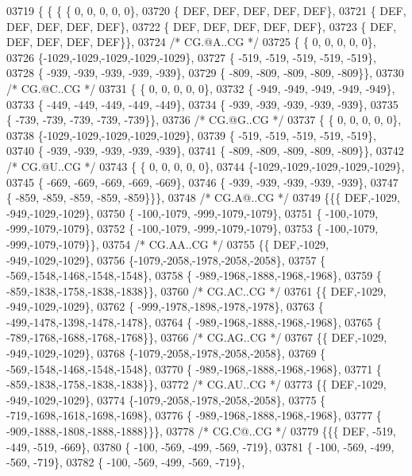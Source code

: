 \begin{DoxyCode}
03719 \{ \{ \{ \{  0, 0, 0, 0, 0\},
03720 \{  DEF,  DEF,  DEF,  DEF,  DEF\},
03721 \{  DEF,  DEF,  DEF,  DEF,  DEF\},
03722 \{  DEF,  DEF,  DEF,  DEF,  DEF\},
03723 \{  DEF,  DEF,  DEF,  DEF,  DEF\}\},
03724 \textcolor{comment}{/* CG.@A..CG */}
03725 \{ \{  0, 0, 0, 0, 0\},
03726 \{-1029,-1029,-1029,-1029,-1029\},
03727 \{ -519, -519, -519, -519, -519\},
03728 \{ -939, -939, -939, -939, -939\},
03729 \{ -809, -809, -809, -809, -809\}\},
03730 \textcolor{comment}{/* CG.@C..CG */}
03731 \{ \{  0, 0, 0, 0, 0\},
03732 \{ -949, -949, -949, -949, -949\},
03733 \{ -449, -449, -449, -449, -449\},
03734 \{ -939, -939, -939, -939, -939\},
03735 \{ -739, -739, -739, -739, -739\}\},
03736 \textcolor{comment}{/* CG.@G..CG */}
03737 \{ \{  0, 0, 0, 0, 0\},
03738 \{-1029,-1029,-1029,-1029,-1029\},
03739 \{ -519, -519, -519, -519, -519\},
03740 \{ -939, -939, -939, -939, -939\},
03741 \{ -809, -809, -809, -809, -809\}\},
03742 \textcolor{comment}{/* CG.@U..CG */}
03743 \{ \{  0, 0, 0, 0, 0\},
03744 \{-1029,-1029,-1029,-1029,-1029\},
03745 \{ -669, -669, -669, -669, -669\},
03746 \{ -939, -939, -939, -939, -939\},
03747 \{ -859, -859, -859, -859, -859\}\}\},
03748 \textcolor{comment}{/* CG.A@..CG */}
03749 \{\{\{  DEF,-1029, -949,-1029,-1029\},
03750 \{ -100,-1079, -999,-1079,-1079\},
03751 \{ -100,-1079, -999,-1079,-1079\},
03752 \{ -100,-1079, -999,-1079,-1079\},
03753 \{ -100,-1079, -999,-1079,-1079\}\},
03754 \textcolor{comment}{/* CG.AA..CG */}
03755 \{\{  DEF,-1029, -949,-1029,-1029\},
03756 \{-1079,-2058,-1978,-2058,-2058\},
03757 \{ -569,-1548,-1468,-1548,-1548\},
03758 \{ -989,-1968,-1888,-1968,-1968\},
03759 \{ -859,-1838,-1758,-1838,-1838\}\},
03760 \textcolor{comment}{/* CG.AC..CG */}
03761 \{\{  DEF,-1029, -949,-1029,-1029\},
03762 \{ -999,-1978,-1898,-1978,-1978\},
03763 \{ -499,-1478,-1398,-1478,-1478\},
03764 \{ -989,-1968,-1888,-1968,-1968\},
03765 \{ -789,-1768,-1688,-1768,-1768\}\},
03766 \textcolor{comment}{/* CG.AG..CG */}
03767 \{\{  DEF,-1029, -949,-1029,-1029\},
03768 \{-1079,-2058,-1978,-2058,-2058\},
03769 \{ -569,-1548,-1468,-1548,-1548\},
03770 \{ -989,-1968,-1888,-1968,-1968\},
03771 \{ -859,-1838,-1758,-1838,-1838\}\},
03772 \textcolor{comment}{/* CG.AU..CG */}
03773 \{\{  DEF,-1029, -949,-1029,-1029\},
03774 \{-1079,-2058,-1978,-2058,-2058\},
03775 \{ -719,-1698,-1618,-1698,-1698\},
03776 \{ -989,-1968,-1888,-1968,-1968\},
03777 \{ -909,-1888,-1808,-1888,-1888\}\}\},
03778 \textcolor{comment}{/* CG.C@..CG */}
03779 \{\{\{  DEF, -519, -449, -519, -669\},
03780 \{ -100, -569, -499, -569, -719\},
03781 \{ -100, -569, -499, -569, -719\},
03782 \{ -100, -569, -499, -569, -719\},

\end{DoxyCode}
